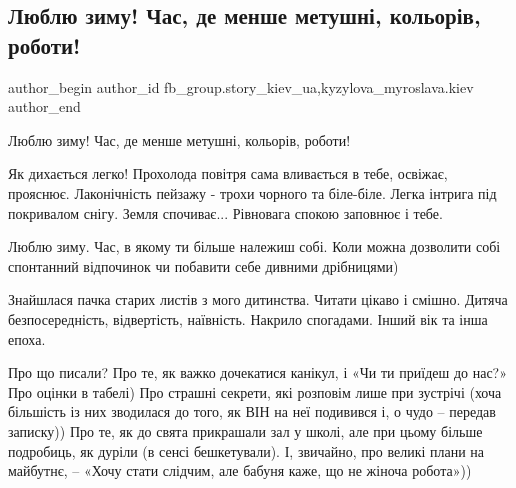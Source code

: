  
 
 
 
 
 
\subsection{Люблю зиму! Час, де менше метушні, кольорів, роботи!}
\label{sec:29_01_2022.fb.fb_group.story_kiev_ua.2.ljublju_zima}
 
\ifcmt
 author_begin
   author_id fb_group.story_kiev_ua,kyzylova_myroslava.kiev
 author_end
\fi

Люблю зиму! Час, де менше метушні, кольорів, роботи!

Як дихається легко! Прохолода повітря сама вливається в тебе, освіжає,
прояснює. Лаконічність пейзажу - трохи чорного та біле-біле. Легка інтрига під
покривалом снігу. Земля спочиває... Рівновага спокою заповнює і тебе.

Люблю зиму. Час, в якому ти більше належиш собі. Коли можна дозволити собі
спонтанний відпочинок чи побавити себе дивними дрібницями) 

\raggedcolumns
\begin{multicols}{3} %
\setlength{\parindent}{0pt}


\end{multicols} %

Знайшлася пачка старих листів з мого дитинства. Читати цікаво і смішно.
Дитяча безпосередність, відвертість, наївність. Накрило спогадами. Інший вік
та інша епоха.

Про що писали? Про те, як важко дочекатися канікул, і «Чи ти приїдеш до нас?»
Про оцінки в табелі) Про страшні секрети, які розповім лише при зустрічі (хоча
більшість із них зводилася до того, як ВІН на неї подивився і, о чудо – передав
записку)) Про те, як до свята прикрашали зал у школі, але при цьому більше
подробиць, як дуріли (в сенсі бешкетували). І, звичайно, про великі плани на
майбутнє, – «Хочу стати слідчим, але бабуня каже, що не жіноча робота»))

